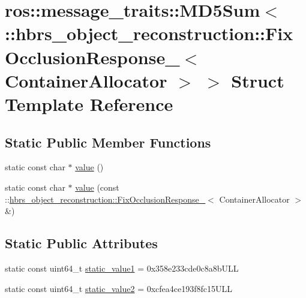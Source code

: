 \hypertarget{structros_1_1message__traits_1_1_m_d5_sum_3_01_1_1hbrs__object__reconstruction_1_1_fix_occlusionf94b88f4ea6b60740cb70fc3946f1a3c}{\section{ros\-:\-:message\-\_\-traits\-:\-:\-M\-D5\-Sum$<$ \-:\-:hbrs\-\_\-object\-\_\-reconstruction\-:\-:\-Fix\-Occlusion\-Response\-\_\-$<$ \-Container\-Allocator $>$ $>$ \-Struct \-Template \-Reference}
\label{structros_1_1message__traits_1_1_m_d5_sum_3_01_1_1hbrs__object__reconstruction_1_1_fix_occlusionf94b88f4ea6b60740cb70fc3946f1a3c}
}
\subsection*{\-Static \-Public \-Member \-Functions}
\begin{DoxyCompactItemize}
\item 
static const char $\ast$ \hyperlink{structros_1_1message__traits_1_1_m_d5_sum_3_01_1_1hbrs__object__reconstruction_1_1_fix_occlusionf94b88f4ea6b60740cb70fc3946f1a3c_a28050fa1585d5c50f8b42fd808546247}{value} ()
\item 
static const char $\ast$ \hyperlink{structros_1_1message__traits_1_1_m_d5_sum_3_01_1_1hbrs__object__reconstruction_1_1_fix_occlusionf94b88f4ea6b60740cb70fc3946f1a3c_a56c6763fb1a727e486e3326d17ab3f5d}{value} (const \-::\hyperlink{structhbrs__object__reconstruction_1_1_fix_occlusion_response__}{hbrs\-\_\-object\-\_\-reconstruction\-::\-Fix\-Occlusion\-Response\-\_\-}$<$ \-Container\-Allocator $>$ \&)
\end{DoxyCompactItemize}
\subsection*{\-Static \-Public \-Attributes}
\begin{DoxyCompactItemize}
\item 
static const uint64\-\_\-t \hyperlink{structros_1_1message__traits_1_1_m_d5_sum_3_01_1_1hbrs__object__reconstruction_1_1_fix_occlusionf94b88f4ea6b60740cb70fc3946f1a3c_afe5359dd7e54168d6aa2fb44e5f4044d}{static\-\_\-value1} = 0x358e233cde0c8a8b\-U\-L\-L
\item 
static const uint64\-\_\-t \hyperlink{structros_1_1message__traits_1_1_m_d5_sum_3_01_1_1hbrs__object__reconstruction_1_1_fix_occlusionf94b88f4ea6b60740cb70fc3946f1a3c_ae289664f41b39b7243899c1cf81e6afb}{static\-\_\-value2} = 0xcfea4ce193f8fc15\-U\-L\-L
\end{DoxyCompactItemize}
